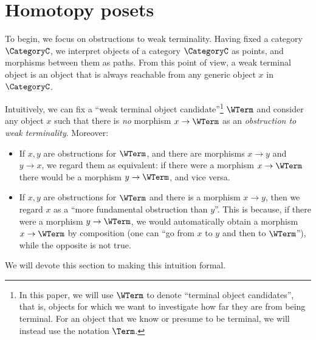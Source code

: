 \section{Homotopy posets}\label{sec: homotopy poset}
%
To begin, we focus on obstructions to weak terminality.
Having fixed a category $\CategoryC$, we interpret objects of a category $\CategoryC$ as points, and morphisms between them as paths. 
From this point of view, a weak terminal object is an object that is always reachable from any generic object $x$ in $\CategoryC$.

Intuitively, we can fix a ``weak terminal object candidate''\footnote{
    In this paper, we will use $\WTerm$ to denote ``terminal object candidates'', that is, objects for which we want to investigate how far they are from being terminal. For an object that we know or presume to be terminal, we will instead use the notation $\Term$.
} $\WTerm$ and consider any object $x$ such that there is \emph{no} morphism $x \to \WTerm$ as an \emph{obstruction to weak terminality}.
Moreover:
%
%
\begin{itemize}
    \item If $x, y$ are obstructions for $\WTerm$, and there are morphisms $x \to y$ and $y \to x$, we regard them as equivalent: if there were a morphism $x \to \WTerm$ there would be a morphism $y \to \WTerm$, and vice versa.
    \item If $x,y$ are obstructions for $\WTerm$ and there is a morphism $x \to y$, then we regard $x$ as a ``more fundamental obstruction than $y$''. 
    This is because, if there were a morphism $y \to \WTerm$, we would automatically obtain a morphism $x \to \WTerm$ by composition (one can ``go from $x$ to $y$ and then to $\WTerm$''), while the opposite is not true.
\end{itemize}
%
We will devote this section to making this intuition formal.
%
%
